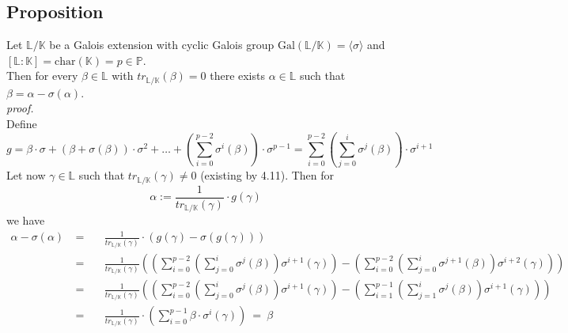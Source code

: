\documentclass[12pt]{book}
\begin{document}
\begin{spacing}{1.3}
\subsection{Proposition } %
\titleformat{\subsection}{\normalfont\normalsize\bfseries}{}{0em}{#1 \thesubsection}
Let $\mathbb{L}/\mathbb{K}$ be a Galois extension with cyclic Galois group $\textrm{Gal}(\mathbb{L}/\mathbb{K})=\langle \sigma \rangle$ and \linebreak $[\mathbb{L}:\mathbb{K}]=\textrm{char}(\mathbb{K})=p\in\mathbb{P}$.\\
Then for every $\beta \in \mathbb{L}$ with $tr_{\mathbb{L}/\mathbb{K}}(\beta)=0$ there exists $\alpha \in \mathbb{L}$ such that $\beta=\alpha-\sigma(\alpha)$.\\
\textit{proof.}\\
Define
$$g=\beta \cdot \sigma + \left(\beta+\sigma(\beta)\right)\cdot \sigma^2+ \ldots + \left(\sum_{i=0}^{p-2} \sigma^{i}(\beta)\right) \cdot \sigma^{p-1}=\sum_{i=0}^{p-2} \left(\sum_{j=0}^{i} \sigma^{j}(\beta)\right)\cdot \sigma^{i+1}$$
Let now $\gamma \in \mathbb{L}$ such that $tr_{\mathbb{L}/\mathbb{K}}(\gamma) \neq 0$ (existing by 4.11). Then for
$$\alpha:=\frac{1}{tr_{\mathbb{L}/\mathbb{K}}(\gamma)} \cdot g(\gamma)$$
we have
\begin{alignat*}{5}
\alpha-\sigma(\alpha) \ &=&& \ \frac{1}{tr_{\mathbb{L}/\mathbb{K}}(\gamma)} \cdot \left(g(\gamma)-\sigma\left(g(\gamma)\right)\right) \\
&=&& \ \frac{1}{tr_{\mathbb{L}/\mathbb{K}}(\gamma)}  \left(\left(\sum_{i=0}^{p-2}\left(\sum_{j=0}^{i} \sigma^{j}(\beta)\right) \sigma^{i+1}(\gamma)\right)- \left(\sum_{i=0}^{p-2}\left(\sum_{j=0}^{i} \sigma^{j+1}(\beta)\right) \sigma^{i+2}(\gamma)\right)\right) \\
&=&& \  \frac{1}{tr_{\mathbb{L}/\mathbb{K}}(\gamma)}  \left(\left(\sum_{i=0}^{p-2}\left(\sum_{j=0}^{i} \sigma^{j}(\beta)\right) \sigma^{i+1}(\gamma)\right)- \left(\sum_{i=1}^{p-1}\left(\sum_{j=1}^{i} \sigma^{j}(\beta)\right) \sigma^{i+1}(\gamma)\right)\right) \\
&=&& \ \frac{1}{tr_{\mathbb{L}/\mathbb{K}}(\gamma)} \cdot \left(\sum_{i=0}^{p-1} \beta \cdot \sigma^{i}(\gamma) \right)
\ = \ \beta
\end{alignat*}


\end{spacing}
\end{document}

